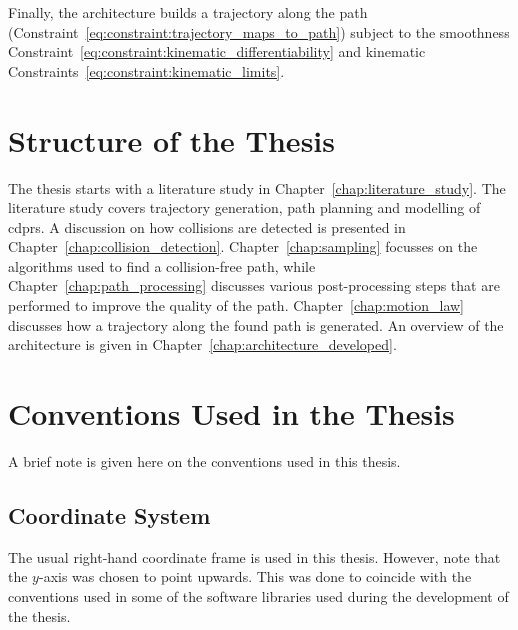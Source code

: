 		Finally, the architecture builds a trajectory along the path
		(Constraint~\ref{eq:constraint:trajectory_maps_to_path}) subject to the
		smoothness Constraint~\ref{eq:constraint:kinematic_differentiability}
		and kinematic Constraints~\ref{eq:constraint:kinematic_limits}.

	\section{Structure of the Thesis}

		The thesis starts with a literature study in
		Chapter~\ref{chap:literature_study}. The literature study covers
		trajectory generation, path planning and modelling of \glspl{cdpr}.  A
		discussion on how collisions are detected is presented in
		Chapter~\ref{chap:collision_detection}. Chapter~\ref{chap:sampling}
		focusses on the algorithms used to find a collision-free path, while
		Chapter~\ref{chap:path_processing} discusses various post-processing
		steps that are performed to improve the quality of the path.
		Chapter~\ref{chap:motion_law} discusses how a trajectory along the found
		path is generated. An overview of the architecture is given in
		Chapter~\ref{chap:architecture_developed}.

	\section{Conventions Used in the Thesis}

		A brief note is given here on the conventions used in this thesis.

		\subsection{Coordinate System}

			The usual right-hand coordinate frame is used in this thesis.
			However, note that the $y$-axis was chosen to point upwards. This
			was done to coincide with the conventions used in some of the
			software libraries used during the development of the thesis.
